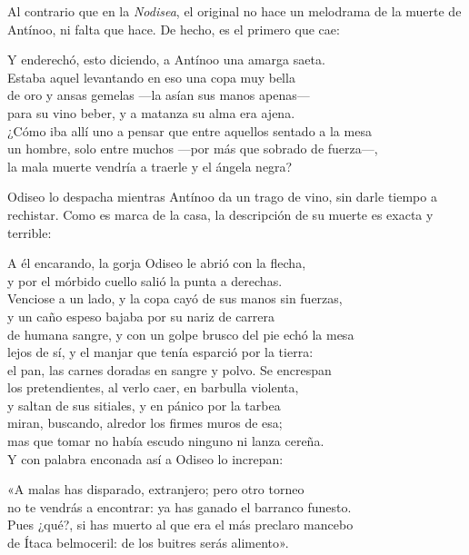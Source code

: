 \label{cap:matanza}

Al contrario que en la \emph{Nodisea}, el original no hace un melodrama de la muerte de Antínoo, ni falta que hace. De hecho, es el primero que cae:

\begin{versocita}
Y enderechó, esto diciendo, a Antínoo una amarga saeta.\\
Estaba aquel levantando en eso una copa muy bella\\
de oro y ansas gemelas ---la asían sus manos apenas---\\
para su vino beber, y a matanza su alma era ajena.\\
¿Cómo iba allí uno a pensar que entre aquellos sentado a la mesa\\
un hombre, solo entre muchos ---por más que sobrado de fuerza---,\\
la mala muerte vendría a traerle y el ángela negra?
\end{versocita}

Odiseo lo despacha mientras Antínoo da un trago de vino, sin darle tiempo a rechistar. Como es marca de la casa, la descripción de su muerte es exacta y terrible:

\begin{versocita}
A él encarando, la gorja Odiseo le abrió con la flecha,\\
y por el mórbido cuello salió la punta a derechas.\\
Venciose a un lado, y la copa cayó de sus manos sin fuerzas,\\
y un caño espeso bajaba por su nariz de carrera\\
de humana sangre, y con un golpe brusco del pie echó la mesa\\
lejos de sí, y el manjar que tenía esparció por la tierra:\\
el pan, las carnes doradas en sangre y polvo. Se encrespan\\
los pretendientes, al verlo caer, en barbulla violenta,\\
y saltan de sus sitiales, y en pánico por la tarbea\\
miran, buscando, alredor los firmes muros de esa;\\
mas que tomar no había escudo ninguno ni lanza cereña.\\
Y con palabra enconada así a Odiseo lo increpan:
\end{versocita}

\begin{versocita}
«A malas has disparado, extranjero; pero otro torneo\\
no te vendrás a encontrar: ya has ganado el barranco funesto.\\
Pues ¿qué?, si has muerto al que era el más preclaro mancebo\\
de Ítaca belmoceril: de los buitres serás alimento».
\end{versocita}

